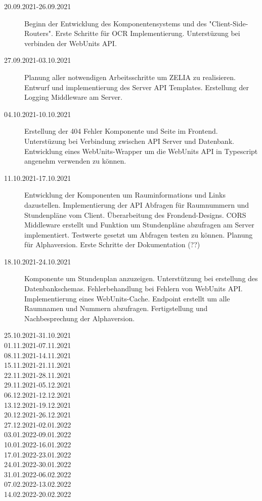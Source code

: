 
\begin{description}
    \item[20.09.2021-26.09.2021] Beginn der Entwicklung des Komponentensystems und des "Client-Side-Routers". Erste Schritte für OCR Implementierung. Unterstüzung bei verbinden der WebUnits API.
    \item[27.09.2021-03.10.2021] Planung aller notwendigen Arbeitsschritte um ZELIA zu realisieren. Entwurf und implementierung des Server API Templates. Erstellung der Logging Middleware am Server.
    \item[04.10.2021-10.10.2021] Erstellung der 404 Fehler Komponente und Seite im Frontend. Unterstüzung bei Verbindung zwischen API Server und Datenbank. Entwicklung eines WebUnits-Wrapper um die WebUnits API in Typescript angenehm verwenden zu können.
    \item[11.10.2021-17.10.2021] Entwicklung der Komponenten um Rauminformations und Links dazustellen. Implementierung der API Abfragen für Raumnummern und Stundenpläne vom Client. Überarbeitung des Frondend-Designs. CORS Middleware erstellt und Funktion um Stundenpläne abzufragen am Server implementiert. Testwerte gesetzt um Abfragen testen zu können. Planung für Alphaversion. Erste Schritte der Dokumentation (??)
    \item[18.10.2021-24.10.2021] Komponente um Stundenplan anzuzeigen. Unterstützung bei erstellung des Datenbankschemas. Fehlerbehandlung bei Fehlern von WebUnits API. Implementierung eines WebUnits-Cache. Endpoint erstellt um alle Raumnamen und Nummern abzufragen. Fertigstellung und Nachbesprechung der Alphaversion.
    \item[25.10.2021-31.10.2021]
    \item[01.11.2021-07.11.2021]
    \item[08.11.2021-14.11.2021]
    \item[15.11.2021-21.11.2021]
    \item[22.11.2021-28.11.2021]
    \item[29.11.2021-05.12.2021]
    \item[06.12.2021-12.12.2021]
    \item[13.12.2021-19.12.2021]
    \item[20.12.2021-26.12.2021]
    \item[27.12.2021-02.01.2022]
    \item[03.01.2022-09.01.2022]
    \item[10.01.2022-16.01.2022]
    \item[17.01.2022-23.01.2022]
    \item[24.01.2022-30.01.2022]
    \item[31.01.2022-06.02.2022]
    \item[07.02.2022-13.02.2022]
    \item[14.02.2022-20.02.2022] 
\end{description}